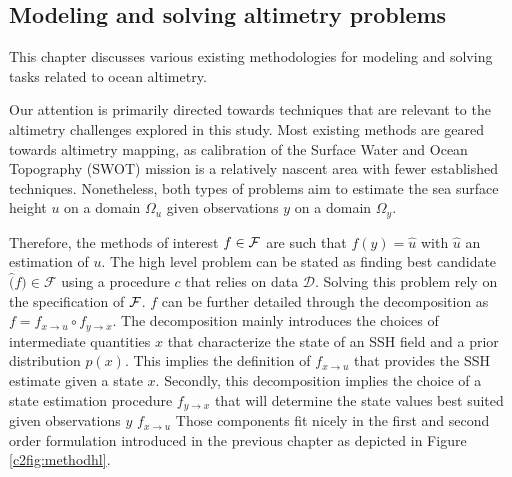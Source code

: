 \begin{bibunit}

  \chapter{Modeling and solving altimetry problems}
  

This chapter discusses various existing methodologies for modeling and solving tasks related to ocean altimetry. 



Our attention is primarily directed towards techniques that are relevant to the altimetry challenges explored in this study. Most existing methods are geared towards altimetry mapping, as calibration of the Surface Water and Ocean Topography (SWOT) mission is a relatively nascent area with fewer established techniques. Nonetheless, both types of problems aim to estimate the sea surface height $u$ on a domain $\Omega_u$ given observations $y$ on a domain $\Omega_y$.

  Therefore, the methods of interest $f \in \cal{F}$  are such that $f(y) = \hat{u}$ with $\hat{u}$ an estimation of $u$.
   The high level problem can be stated as finding best candidate $\hat(f) \in \mathcal{F}$ using a procedure $c$ that relies on data $\mathcal{D}$. 
   Solving this problem rely on the specification of $\cal{F}$.
  $f$ can be further detailed through the decomposition as $f = f_{x\to u} \circ f_{y\to x}$. The decomposition mainly introduces the choices of intermediate quantities $x$ that characterize the state of an SSH field and a prior distribution $p(x)$. This implies the definition of $f_{x\to u}$ that provides the SSH estimate given a state $x$.
  Secondly, this decomposition implies the choice of a state estimation procedure $f_{y\to x}$ that will determine the state values best suited given observations $y$
$f_{x\to u}$
  Those components fit nicely in the first and second order formulation introduced in the previous chapter as depicted in Figure \ref{c2fig:methodhl}.


\end{bibunit}

